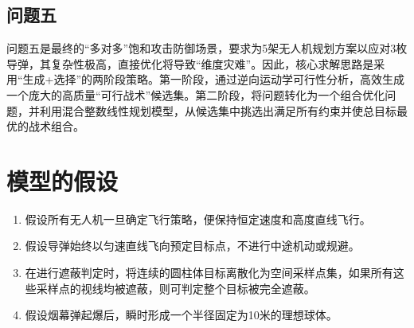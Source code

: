 \documentclass[5pt, withoutpreface,bwprint]{cumcmthesis} %
\begin{document}
       \subsection{问题五}
       问题五是最终的“多对多”饱和攻击防御场景，要求为5架无人机规划方案以应对3枚导弹，其复杂性极高，直接优化将导致“维度灾难”。因此，核心求解思路是采用“生成+选择”的两阶段策略。第一阶段，通过逆向运动学可行性分析，高效生成一个庞大的高质量“可行战术”候选集。第二阶段，将问题转化为一个组合优化问题，并利用混合整数线性规划模型，从候选集中挑选出满足所有约束并使总目标最优的战术组合。
\section{模型的假设}
        
        \begin{enumerate}[label=(\arabic*)]
        \item 假设所有无人机一旦确定飞行策略，便保持恒定速度和高度直线飞行。
        \item 假设导弹始终以匀速直线飞向预定目标点，不进行中途机动或规避。
        \item 在进行遮蔽判定时，将连续的圆柱体目标离散化为空间采样点集，如果所有这些采样点的视线均被遮蔽，则可判定整个目标被完全遮蔽。
        \item 假设烟幕弹起爆后，瞬时形成一个半径固定为10米的理想球体。
        
    
        \end{enumerate}
\end{document}
